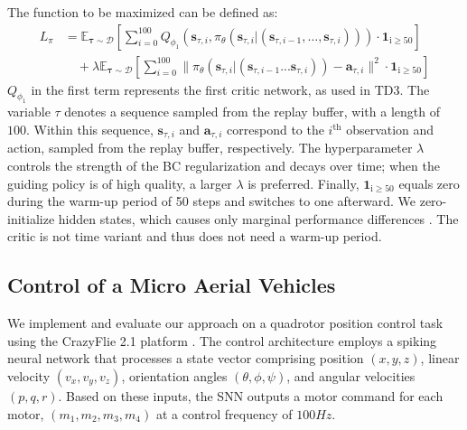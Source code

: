 The function to be maximized can be defined as:
\begin{align}
    L_{\pi} &= \mathbb{E}_{\mathbf{\tau} \sim \mathcal{D}} \left[ \sum^{100}_{i=0} Q_{\phi_1}\left( \mathbf{s}_{\tau,i}, \pi_{\theta}(\mathbf{s}_{\tau,i}| (\mathbf{s}_{\tau,i-1}, \dots, \mathbf{s}_{\tau,i})) \right) \cdot \mathbf{1}_\mathrm{i\geq50} \right] \nonumber \\
    &\quad + \lambda \mathbb{E}_{\mathbf{\tau} \sim \mathcal{D}} \left[ \sum^{100}_{i=0} \|\pi_{\theta}(\mathbf{s}_{\tau,i}| (\mathbf{s}_{\tau,i-1}...\mathbf{s}_{\tau,i})) - \mathbf{a}_{\tau,i} \|^2 \cdot \mathbf{1}_\mathrm{i\geq50} \right]
\end{align}
\( Q_{\phi_1} \) in the first term represents the first critic network, as used in TD3. The variable \( \tau \) denotes a sequence sampled from the replay buffer, with a length of $100$. Within this sequence, \( \mathbf{s}_{\tau,i} \) and \( \mathbf{a}_{\tau,i} \) correspond to the \( i^\text{th} \) observation and action, sampled from the replay buffer, respectively. The hyperparameter \( \lambda \) controls the strength of the BC regularization and decays over time; when the guiding policy is of high quality, a larger \( \lambda \) is preferred. Finally, \( \mathbf{1}_\mathrm{i\geq50} \) equals zero during the warm-up period of 50 steps and switches to one afterward. We zero-initialize hidden states, which causes only marginal performance differences \cite{Kapturowski2019}. The critic is not time variant and thus does not need a warm-up period.


\subsection{Control of a Micro Aerial Vehicles}
We implement and evaluate our approach on a quadrotor position control task using the CrazyFlie 2.1 platform \cite{crazyflie}. The control architecture employs a spiking neural network that processes a state vector comprising position $(x, y, z)$, linear velocity $(v_x, v_y, v_z)$, orientation angles $(\theta, \phi, \psi)$, and angular velocities $(p, q, r)$. Based on these inputs, the SNN outputs a motor command for each motor, $(m_1, m_2, m_3, m_4)$ at a control frequency of $100Hz$.

